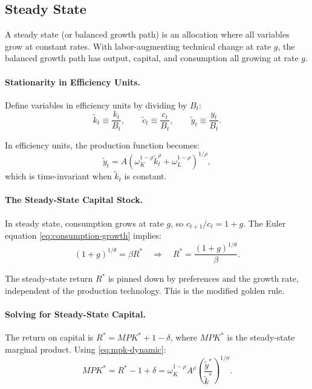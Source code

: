 \subsection{Steady State}
\label{subsec:steady-state}

A steady state (or balanced growth path) is an allocation where all variables grow at constant rates. With labor-augmenting technical change at rate $g$, the balanced growth path has output, capital, and consumption all growing at rate $g$.

\paragraph{Stationarity in Efficiency Units.}
Define variables in efficiency units by dividing by $B_t$:
\begin{equation}
\tilde{k}_t \equiv \frac{k_t}{B_t}, \qquad \tilde{c}_t \equiv \frac{c_t}{B_t}, \qquad \tilde{y}_t \equiv \frac{y_t}{B_t}.
\label{eq:efficiency-units}
\end{equation}

In efficiency units, the production function becomes:
\begin{equation}
\tilde{y}_t = A \left( \omega_K^{1-\rho} \tilde{k}_t^\rho + \omega_L^{1-\rho} \right)^{1/\rho},
\label{eq:production-efficiency}
\end{equation}
which is time-invariant when $\tilde{k}_t$ is constant.

\paragraph{The Steady-State Capital Stock.}
In steady state, consumption grows at rate $g$, so $c_{t+1}/c_t = 1 + g$. The Euler equation \cref{eq:consumption-growth} implies:
\begin{equation}
(1+g)^{1/\theta} = \beta R^* \quad \Longrightarrow \quad R^* = \frac{(1+g)^{1/\theta}}{\beta}.
\label{eq:steady-state-return}
\end{equation}

The steady-state return $R^*$ is pinned down by preferences and the growth rate, independent of the production technology. This is the modified golden rule.

\paragraph{Solving for Steady-State Capital.}
The return on capital is $R^* = MPK^* + 1 - \delta$, where $MPK^*$ is the steady-state marginal product. Using \cref{eq:mpk-dynamic}:
\begin{equation}
MPK^* = R^* - 1 + \delta = \omega_K^{1-\rho} A^\rho \left( \frac{\tilde{y}^*}{\tilde{k}^*} \right)^{1/\sigma}.
\label{eq:mpk-steady-state}
\end{equation}

